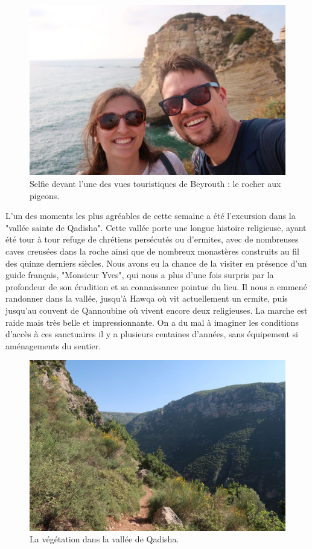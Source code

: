 \begin{figure}
\centering
\includegraphics{images/20180521_Rausche.JPG}
\caption{Selfie devant l'une des vues touristiques de Beyrouth : le
rocher aux pigeons.}
\end{figure}

L'un des moments les plus agréables de cette semaine a été l'excursion
dans la "vallée sainte de Qadisha". Cette vallée porte une longue
histoire religieuse, ayant été tour à tour refuge de chrétiens
persécutés ou d'ermites, avec de nombreuses caves creusées dans la roche
ainsi que de nombreux monastères construits au fil des quinze derniers
siècles. Nous avons eu la chance de la visiter en présence d'un guide
français, "Monsieur Yves", qui nous a plus d'une fois surpris par la
profondeur de son érudition et sa connaissance pointue du lieu. Il nous
a emmené randonner dans la vallée, jusqu'à Hawqa où vit actuellement un
ermite, puis jusqu'au couvent de Qannoubine où vivent encore deux
religieuses. La marche est raide mais très belle et impressionnante. On
a du mal à imaginer les conditions d'accès à ces sanctuaires il y a
plusieurs centaines d'années, sans équipement si aménagements du
sentier.

\begin{figure}
\centering
\includegraphics{images/20180521_qadisha.JPG}
\caption{La végétation dans la vallée de Qadisha.}
\end{figure}

